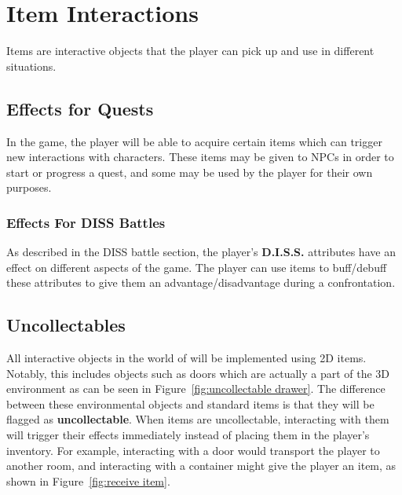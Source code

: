 \section{Item Interactions}
\label{sec:items}
Items are interactive objects that the player can pick up and use in different situations.

\subsection{Effects for Quests}
In the game, the player will be able to acquire certain items which can trigger new interactions with characters. These items may be given to NPCs in order to start or progress a quest, and some may be used by the player for their own purposes.

\subsubsection{Effects For DISS Battles}
As described in the DISS battle section, the player's \textbf{D.I.S.S.} attributes have an effect on different aspects of the game. The player can use items to buff/debuff these attributes to give them an advantage/disadvantage during a confrontation.

\subsection{Uncollectables}
All interactive objects in the world of \ourgame{} will be implemented using 2D items. Notably, this includes objects such as doors which are actually a part of the 3D environment as can be seen in Figure~\ref{fig:uncollectable drawer}. The difference between these environmental objects and standard items is that they will be flagged as \textbf{uncollectable}. When items are uncollectable, interacting with them will trigger their effects immediately instead of placing them in the player's inventory. For example, interacting with a door would transport the player to another room, and interacting with a container might give the player an item, as shown in Figure~\ref{fig:receive item}.

